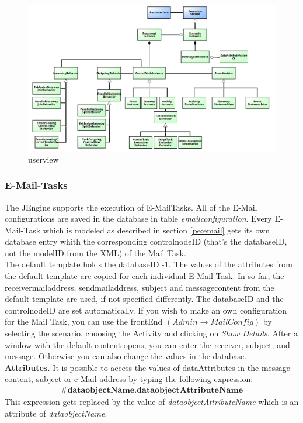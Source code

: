 \begin{figure}[h!]
\centering
\includegraphics[width=6in]{img/ClassDiagramm.png}
\caption{userview}
\label{fig:userview}
\end{figure}

\subsubsection{E-Mail-Tasks}
\label{jCore:MailTask}
The JEngine supports the execution of E-MailTasks. All of the E-Mail configurations are saved in the database in table \textit{emailconfiguration}. Every E-Mail-Task which is modeled as described in section \ref{pe:email} gets its own database entry whith the corresponding controlnodeID (that's the databaseID, not the modelID from the XML) of the Mail Task.\\
The default template holds the databaseID -1. The values of the attributes from the default template are copied for each individual E-Mail-Task. In so far, the receivermailaddress, sendmailaddress, subject and messagecontent from the default template are used, if not specified differently. The databaseID and the controlnodeID are set automatically. If you wish to make an own configuration for the Mail Task, you can use the frontEnd 
\begin{math}(Admin\rightarrow Mail Config)\end{math}
by selecting the scenario, choosing the Activity and clicking on \textit{Show Details}. After a window with the default content opens, you can enter the receiver, subject, and message. Otherwise you can also change the values in the database.\\
\textbf{Attributes.} It is possible to access the values of dataAttributes in the message content, subject or e-Mail address by typing the following expression:
\begin{align}
\textbf{\#dataobjectName.dataobjectAttributeName} \nonumber
\end{align}
This expression gets replaced by the value of \textit{dataobjectAttributeName} which is an attribute of \textit{dataobjectName}.


